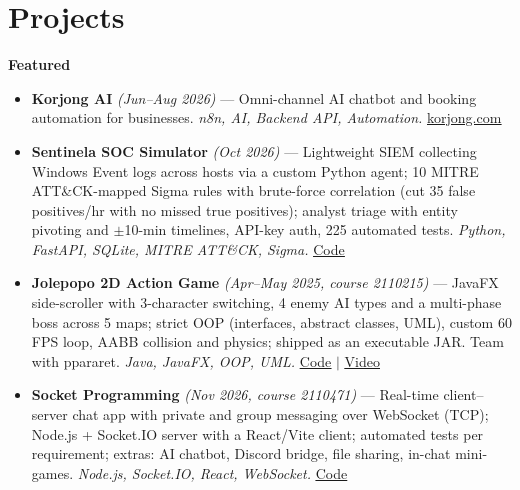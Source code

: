 \documentclass[11pt,a4paper]{article}
\let\oldhref\href
\renewcommand{\href}[2]{\oldhref{#1}{\uline{#2}}}
\begin{document}
\section{Projects}
\textbf{Featured}
\begin{itemize}
  \item \textbf{Korjong AI} \textit{(Jun--Aug 2026)} --- Omni-channel AI chatbot and booking automation for businesses. \textit{n8n, AI, Backend API, Automation.} \href{https://korjong.com}{korjong.com}
  \item \textbf{Sentinela SOC Simulator} \textit{(Oct 2026)} --- Lightweight SIEM collecting Windows Event logs across hosts via a custom Python agent; 10 MITRE ATT\&CK-mapped Sigma rules with brute-force correlation (cut 35 false positives/hr with no missed true positives); analyst triage with entity pivoting and $\pm$10-min timelines, API-key auth, 225 automated tests. \textit{Python, FastAPI, SQLite, MITRE ATT\&CK, Sigma.} \href{https://github.com/NIHKOOL/Sentinela}{Code}
  \item \textbf{Jolepopo 2D Action Game} \textit{(Apr--May 2025, course 2110215)} --- JavaFX side-scroller with 3-character switching, 4 enemy AI types and a multi-phase boss across 5 maps; strict OOP (interfaces, abstract classes, UML), custom 60 FPS loop, AABB collision and physics; shipped as an executable JAR. Team with ppararet. \textit{Java, JavaFX, OOP, UML.} \href{https://github.com/NIHKOOL/Jolepopo}{Code} $\mid$ \href{https://youtu.be/oEIywyK6eEs}{Video}
  \item \textbf{Socket Programming} \textit{(Nov 2026, course 2110471)} --- Real-time client--server chat app with private and group messaging over WebSocket (TCP); Node.js + Socket.IO server with a React/Vite client; automated tests per requirement; extras: AI chatbot, Discord bridge, file sharing, in-chat mini-games. \textit{Node.js, Socket.IO, React, WebSocket.} \href{https://github.com/NIHKOOL/Socket-Programming-Project}{Code}
\end{itemize}
\end{document}
